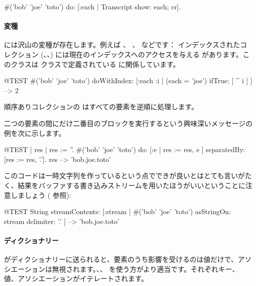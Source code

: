 \documentclass[a4paper,10pt,twoside]{book}
\begin{document}
\begin{code}{}
#('bob' 'joe' 'toto') do: [:each | Transcript show: each; cr].
\end{code}

\paragraph{変種}  には沢山の変種が存在します。例えば 、 、  などです：
インデックスされたコレクション (、、) には現在のインデックスへのアクセスを与える  があります。このクラスは  クラスで定義されている  に関係しています。

\begin{code}{@TEST}
#('bob' 'joe' 'toto') doWithIndex: [:each :i | (each = 'joe') ifTrue: [ ^ i ] ] --> 2
\end{code}

順序ありコレクションの  はすべての要素を逆順に処理します。

二つの要素の間にだけ二番目のブロックを実行するという興味深いメッセージの例を次に示します。
\begin{code}{@TEST | res | }
res := ''.
#('bob' 'joe' 'toto') do: [:e | res := res, e ] separatedBy: [res := res, '.'].
res --> 'bob.joe.toto'
\end{code}
\noindent
このコードは一時文字列を作っているという点でできが良いとはとても言いがたく、結果をバッファする書き込みストリームを用いたほうがいいということに注意しましょう ( 参照):
\begin{code}{@TEST}
String streamContents: [:stream | #('bob' 'joe' 'toto') asStringOn: stream delimiter: '.' ] --> 'bob.joe.toto'
\end{code}



\paragraph{ディクショナリー}
 がディクショナリーに送られると、要素のうち影響を受けるのは値だけで、アソシエーションは無視されます。、、  を使う方がより適当です。それぞれキー、値、アソシエーションがイテレートされます。
\end{document}
